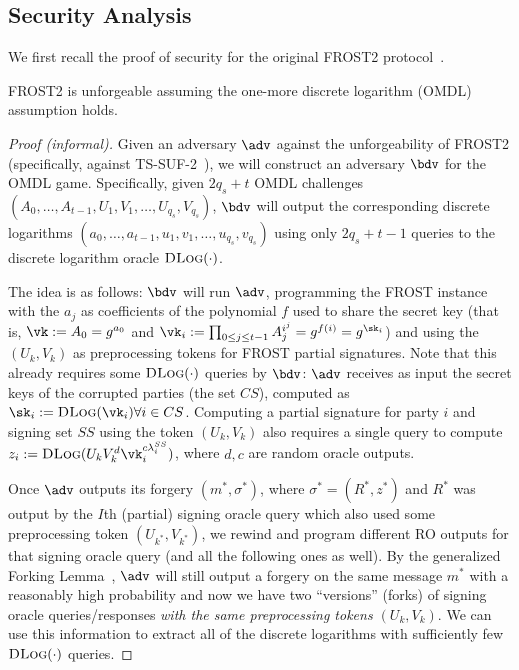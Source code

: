 \subsection{Security Analysis}

We first recall the proof of security for the original FROST2 protocol~\cite{C:BCKMTZ22}.

\begin{theorem}[informal]
    FROST2 is unforgeable assuming the one-more discrete logarithm (OMDL) assumption holds.
\end{theorem}

\begin{proof}[Proof (informal)]
Given an adversary $\adv$ against the unforgeability of FROST2 (specifically, against TS-SUF-2~\cite{C:BCKMTZ22}), we will construct an adversary $\bdv$ for the OMDL game. Specifically, given $2q_s + t$ OMDL challenges $(A_0, \dots, A_{t-1},\allowbreak U_1, V_1, \dots, U_{q_s}, V_{q_s})$, $\bdv$ will output the corresponding discrete logarithms $(a_0,\allowbreak \dots, a_{t-1}, u_1, v_1,\allowbreak \dots, u_{q_s}, v_{q_s})$ using only $2q_s + t - 1$ queries to the discrete logarithm oracle $\textsc{DLog}(\cdot)$.

The idea is as follows: $\bdv$ will run $\adv$, programming the FROST instance with the $a_j$ as coefficients of the polynomial $f$ used to share the secret key (that is, $\vk := A_0 = g^{a_0}$ and $\vk_i := \prod_{0 \leq j \leq t-1} A_j^{i^j} = g^{f(i)} = g^{\sk_i}$) and using the $(U_k, V_k)$ as preprocessing tokens for FROST partial signatures. Note that this already requires some $\textsc{DLog}(\cdot)$ queries by $\bdv$: $\adv$ receives as input the secret keys of the corrupted parties (the set $CS$), computed as $\sk_i := \textsc{DLog}(\vk_i) \forall i \in CS$. Computing a partial signature for party $i$ and signing set $SS$ using the token $(U_k, V_k)$ also requires a single query to compute $z_i := \textsc{DLog}(U_k V_k^d \vk_i^{c \lambda_i^{SS}})$, where $d, c$ are random oracle outputs.

Once $\adv$ outputs its forgery $(m^*, \sigma^*)$, where $\sigma^* = (R^*, z^*)$ and $R^*$ was output by the $I$th (partial) signing oracle query which also used some preprocessing token $(U_{k^*}, V_{k^*})$, we rewind and program different RO outputs for that signing oracle query (and all the following ones as well). By the generalized Forking Lemma~\cite{CCS:BelNev06}, $\adv$ will still output a forgery on the same message $m^*$ with a reasonably high probability and now we have two ``versions'' (forks) of signing oracle queries/responses \emph{with the same preprocessing tokens $(U_k, V_k)$}. We can use this information to extract all of the discrete logarithms with sufficiently few ${\textsc{DLog}}(\cdot)$ queries.


\end{proof}
